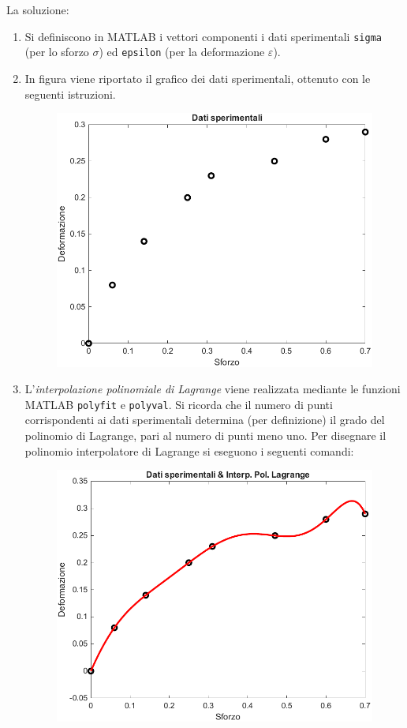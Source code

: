 \noindent
La soluzione:
\begin{enumerate}
	\item Si definiscono in MATLAB i vettori componenti i dati sperimentali \texttt{sigma} (per lo sforzo $\sigma$) ed \texttt{epsilon} (per la deformazione $\varepsilon$).
	
	
	\item In figura viene riportato il grafico dei dati sperimentali, ottenuto con le seguenti istruzioni.
	
	\begin{figure}[!htp]
		\centering
		\includegraphics[width=.7\textwidth]{img/interpolazione-3.pdf}
	\end{figure}
	
	\item L'\emph{interpolazione polinomiale di Lagrange} viene realizzata mediante le funzioni MATLAB \texttt{polyfit} e \texttt{polyval}. Si ricorda che il numero di punti corrispondenti ai dati sperimentali determina (per definizione) il grado del polinomio di Lagrange, pari al numero di punti meno uno. Per disegnare il polinomio interpolatore di Lagrange si eseguono i seguenti comandi:
	
	\newpage
	\begin{figure}[!htp]
		\centering
		\includegraphics[width=.7\textwidth]{img/interpolazione-4.pdf}
	\end{figure}
\end{enumerate}